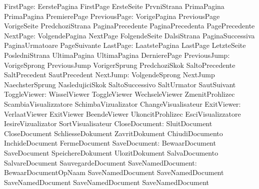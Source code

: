                 FirstPage: EerstePagina              FirstPage
                           ErsteSeite                PrvniStrana
                           PrimaPagina               PrimaPagina
                           PremierePage
             PreviousPage: VorigePagina              PreviousPage
                           VorigeSeite               PredchoziStrana
                           PaginaPrecedente          PaginaPrecedenta
                           PagePrecedente
                 NextPage: VolgendePagina            NextPage
                           FolgendeSeite             DalsiStrana
                           PaginaSuccessiva          PaginaUrmatoare
                           PageSuivante
                 LastPage: LaatstePagina             LastPage
                           LetzteSeite               PosledniStrana
                           UltimaPagina              UltimaPagina
                           DernierePage
             PreviousJump: VorigeSprong              PreviousJump
                           VorigerSprung             PredchoziSkok
                           SaltoPrecedente           SaltPrecedent
                           SautPrecedent
                 NextJump: VolgendeSprong            NextJump
                           NaechsterSprung           NasledujiciSkok
                           SaltoSuccessivo           SaltUrmator
                           SautSuivant
             ToggleViewer: WisselViewer              ToggleViewer
                           WechseleViewer            ZmenitProhlizec
                           ScambiaVisualizzatore     SchimbaVizualizator
                           ChangeVisualisateur
               ExitViewer: VerlaatViewer             ExitViewer
                           BeendeViewer              UkoncitProhlizec
                           EsciVisualizzatore        IesireVizualizator
                           SortVisualisateur
            CloseDocument: SluitDocument             CloseDocument
                           SchliesseDokument         ZavritDokument
                           ChiudiDocumento           InchideDocument
                           FermeDocument
             SaveDocument: BewaarDocument            SaveDocument
                           SpeichereDokument         UlozitDokument
                           SalvaDocumento            SalvareDocument
                           SauvegardeDocument
        SaveNamedDocument: BewaarDocumentOpNaam      SaveNamedDocument
                           SaveNamedDocument         SaveNamedDocument
                           SaveNamedDocument         SaveNamedDocument
